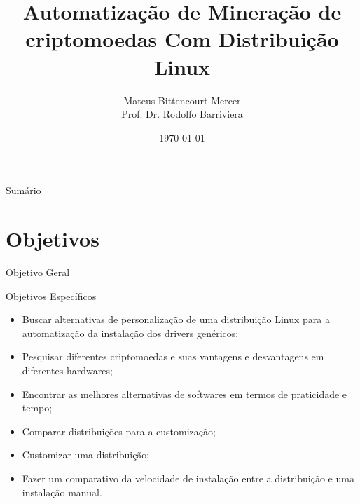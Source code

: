 \documentclass[aspectratio=169]{beamer}
\title{Automatização de Mineração de criptomoedas Com Distribuição Linux}
\author{Mateus Bittencourt Mercer \\ Prof\@. Dr\@. Rodolfo Barriviera}
\institute{Instituto Federal do Paraná Campus Londrina}
\date{\today}
\begin{document}
\begin{frame}
\titlepage
\end{frame}

\begin{frame}{Sumário}
\tableofcontents
\end{frame}

\section{Objetivos}

\begin{frame}{Objetivo Geral}

\noindent{}

\end{frame}

\begin{frame}{Objetivos Específicos}

\begin{itemize} 

    \item Buscar alternativas de personalização de uma distribuição
        Linux para a automatização da instalação dos drivers
        genéricos;\pause

    \item Pesquisar diferentes criptomoedas e suas vantagens e
        desvantagens em diferentes hardwares;\pause

    \item Encontrar as melhores alternativas de softwares em termos de
        praticidade e tempo;\pause

    \item Comparar distribuições para a customização;\pause

    \item Customizar uma distribuição;\pause

    \item Fazer um comparativo da velocidade de instalação entre a
distribuição e uma instalação manual.

\end{itemize}
\end{frame}
\end{document}
